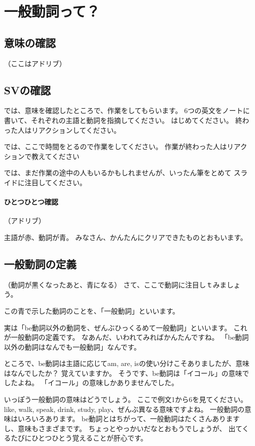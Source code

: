 \documentclass[book,jafontscale=0.9247]{jlreq}
\newcommand{\mySagyo}{%
\par%
\bigskip
では、ここで時間をとるので作業をしてください。
作業が終わった人はリアクションで教えてください\par%
\begin{minipage}[t]{.98\textwidth}
\mbox{}\hrulefill\mbox{}\par%
\mbox{}\hfill{}\raisebox{-.5\height}{作業}\hfill\mbox{}\par%
\mbox{}\hrulefill\mbox{}
\end{minipage}%
\par%
\bigskip%
では、まだ作業の途中の人もいるかもしれませんが、いったん筆をとめて
スライドに注目してください。%
\par%
\bigskip
}
\begin{document}
\section{一般動詞って？}

\subsection{意味の確認}

（ここはアドリブ）

\subsection{SVの確認}

では、意味を確認したところで、作業をしてもらいます。
6つの英文をノートに書いて、それぞれの主語と動詞を指摘してください。
はじめてください。
終わった人はリアクションしてください。

\mySagyo


\paragraph{ひとつひとつ確認}

（アドリブ）

主語が赤、動詞が青。
みなさん、かんたんにクリアできたものとおもいます。

\subsection{一般動詞の定義}
（動詞が黒くなったあと、青になる）
さて、ここで動詞に注目しｔみましょう。

この青で示した動詞のことを、「一般動詞」といいます。

実は「be動詞以外の動詞を、ぜんぶひっくるめて一般動詞」といいます。
これが一般動詞の定義です。
なあんだ、いわれてみればかんたんですね。
「be動詞以外の動詞はなんでも一般動詞」なんです。

ところで、be動詞は主語に応じてam, are, isの使い分けこそありましたが、意味はなんでしたか？
覚えていますか。
そうです、be動詞は「イコール」の意味でしたよね。
「イコール」の意味しかありませんでした。

いっぽう一般動詞の意味はどうでしょう。
ここで例文1から6を見てください。
like, walk, speak, drink, study, play、ぜんぶ異なる意味ですよね。
一般動詞の意味はいろいろあります。
be動詞とはちがって、一般動詞はたくさんありますし、意味もさまざまです。
ちょっとやっかいだなとおもうでしょうが、
出てくるたびにひとつひとう覚えることが肝心です。
\end{document}
